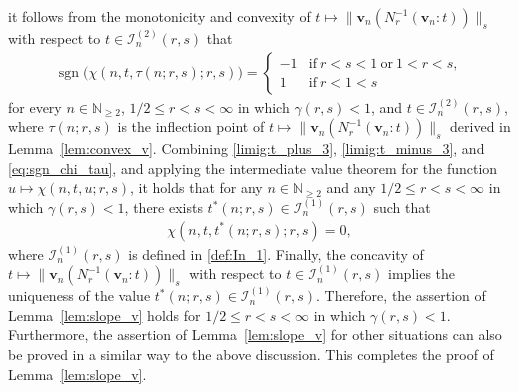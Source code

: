 \documentclass[conference, draftcls, onecolumn]{IEEEtran}
\theoremstyle{plain}
\newcommand{\bvec}[1]{\boldsymbol{#1}}
\newcommand{\sgn}{\operatorname{sgn}}
\newcommand{\lemref}[1]{Lemma~\ref{#1}}
\begin{document}
\begin{IEEEproof}[Proof of \lemref{lem:slope_v}]
\begin{itemize}
\end{itemize}
it follows from the monotonicity and convexity of $t \mapsto \| \bvec{v}_{n}( N_{r}^{-1}( \bvec{v}_{n} : t )) \|_{s}$ with respect to $t \in \mathcal{I}_{n}^{(2)}( r, s )$ that
\begin{align}
\sgn\Big( \chi(n, t, \tau(n; r, s); r, s) \Big)
=
\begin{cases}
-1
& \mathrm{if} \ r < s < 1 \ \mathrm{or} \ 1 < r < s ,
\\
1
& \mathrm{if} \ r < 1 < s
\end{cases}
\label{eq:sgn_chi_tau}
\end{align}
for every $n \in \mathbb{N}_{\ge 2}$, $1/2 \le r < s < \infty$ in which $\gamma( r, s ) < 1$, and $t \in \mathcal{I}_{n}^{(2)}( r, s )$, where $\tau(n; r, s)$ is the inflection point of $t \mapsto \| \bvec{v}_{n}( N_{r}^{-1}( \bvec{v}_{n} : t )) \|_{s}$ derived in \lemref{lem:convex_v}.
Combining \eqref{limig:t_plus_3}, \eqref{limig:t_minus_3}, and \eqref{eq:sgn_chi_tau}, and applying the intermediate value theorem for the function $u \mapsto \chi(n, t, u; r, s)$, it holds that for any $n \in \mathbb{N}_{\ge 2}$ and any $1/2 \le r < s < \infty$ in which $\gamma( r, s ) < 1$, there exists $t^{\ast}(n; r, s) \in \mathcal{I}_{n}^{(1)}( r, s )$ such that
\begin{align}
\chi(n, t, t^{\ast}(n; r, s); r, s)
=
0 ,
\end{align}
where $\mathcal{I}_{n}^{(1)}( r, s )$ is defined in \eqref{def:In_1}.
Finally, the concavity of $t \mapsto \| \bvec{v}_{n}( N_{r}^{-1}( \bvec{v}_{n} : t ) ) \|_{s}$ with respect to $t \in \mathcal{I}_{n}^{(1)}( r, s )$ implies the uniqueness of the value $t^{\ast}(n; r, s) \in \mathcal{I}_{n}^{(1)}( r, s )$.
Therefore, the assertion of \lemref{lem:slope_v} holds for $1/2 \le r < s < \infty$ in which $\gamma( r, s ) < 1$.
Furthermore, the assertion of \lemref{lem:slope_v} for other situations can also be proved in a similar way to the above discussion.
This completes the proof of \lemref{lem:slope_v}.
\end{IEEEproof}
\end{document}
